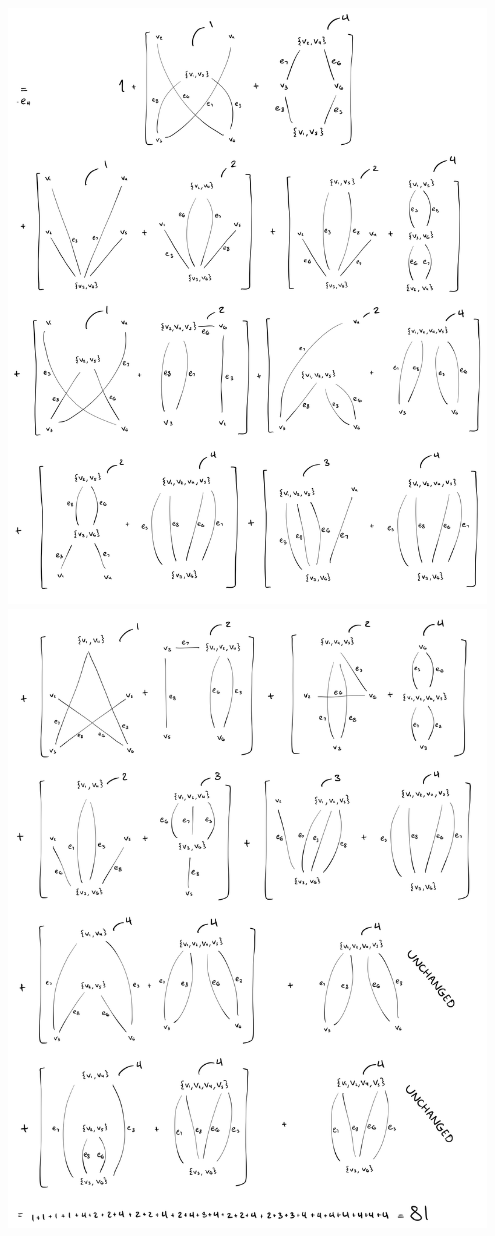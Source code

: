 \documentclass[11pt]{article}
\begin{document}
\begin{itemize}
  \includegraphics[width=0.95\textwidth]{3.jpeg} \\
  \includegraphics[width=0.95\textwidth]{4.jpeg} \\
  \newpage
  




\end{itemize}
\end{document}

